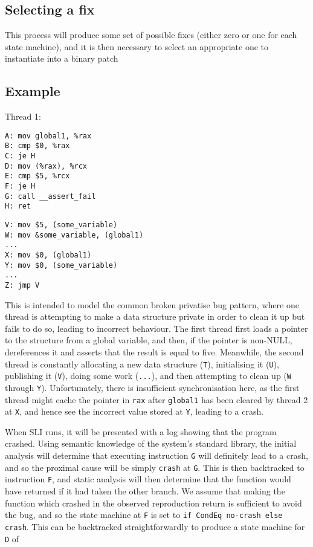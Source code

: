 \documentclass[10pt,twocolumn,preprint,natbib,authoryear]{sigplanconf}
\begin{document}
\subsection{Selecting a fix}

This process will produce some set of possible fixes (either zero or
one for each state machine), and it is then necessary to select an
appropriate one to instantiate into a binary patch 

\subsection{Example}
Thread 1:

\begin{verbatim}
A: mov global1, %rax
B: cmp $0, %rax
C: je H
D: mov (%rax), %rcx
E: cmp $5, %rcx
F: je H
G: call __assert_fail
H: ret
\end{verbatim}

\begin{verbatim}
V: mov $5, (some_variable)
W: mov &some_variable, (global1)
...
X: mov $0, (global1)
Y: mov $0, (some_variable)
...
Z: jmp V
\end{verbatim}

This is intended to model the common broken privatise bug pattern,
where one thread is attempting to make a data structure private in
order to clean it up but fails to do so, leading to incorrect
behaviour.  The first thread first loads a pointer to the structure
from a global variable, and then, if the pointer is non-NULL,
dereferences it and asserts that the result is equal to five.
Meanwhile, the second thread is constantly allocating a new data
structure (\verb|T|), initialising it (\verb|U|), publishing it
(\verb|V|), doing some work (\verb|...|), and then attempting to clean
up (\verb|W| through \verb|Y|).  Unfortunately, there is insufficient
synchronisation here, as the first thread might cache the pointer in
\verb|rax| after \verb|global1| has been cleared by thread 2 at
\verb|X|, and hence see the incorrect value stored at \verb|Y|,
leading to a crash.

When SLI runs, it will be presented with a log showing that the
program crashed.  Using semantic knowledge of the system's standard
library, the initial analysis will determine that executing
instruction \verb|G| will definitely lead to a crash, and so the
proximal cause will be simply \verb|crash| at \verb|G|.  This is then
backtracked to instruction \verb|F|, and static analysis will then
determine that the function would have returned if it had taken the
other branch.  We assume that making the function which crashed in the
observed reproduction return is sufficient to avoid the bug, and so
the state machine at \verb|F| is set to
\verb|if CondEq no-crash else crash|.  This can be backtracked
straightforwardly to produce a state machine for \verb|D| of
\end{document}
